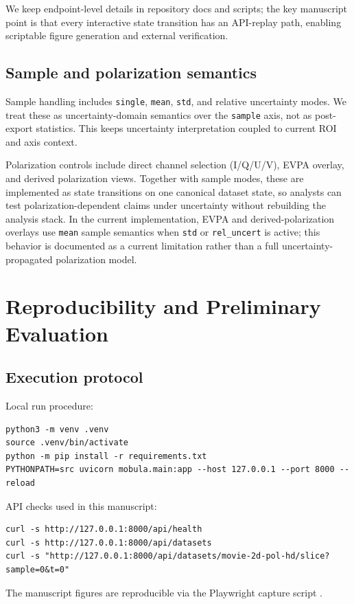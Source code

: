 \documentclass[11pt]{article}
\begin{document}
We keep endpoint-level details in repository docs and scripts; the key manuscript point is that every interactive state transition has an API-replay path, enabling scriptable figure generation and external verification.

\subsection{Sample and polarization semantics}
Sample handling includes \texttt{single}, \texttt{mean}, \texttt{std}, and relative uncertainty modes. We treat these as uncertainty-domain semantics over the \texttt{sample} axis, not as post-export statistics. This keeps uncertainty interpretation coupled to current ROI and axis context.

Polarization controls include direct channel selection (I/Q/U/V), EVPA overlay, and derived polarization views. Together with sample modes, these are implemented as state transitions on one canonical dataset state, so analysts can test polarization-dependent claims under uncertainty without rebuilding the analysis stack. In the current implementation, EVPA and derived-polarization overlays use \texttt{mean} sample semantics when \texttt{std} or \texttt{rel\_uncert} is active; this behavior is documented as a current limitation rather than a full uncertainty-propagated polarization model.

\section{Reproducibility and Preliminary Evaluation}
\subsection{Execution protocol}
Local run procedure:
\begin{verbatim}
python3 -m venv .venv
source .venv/bin/activate
python -m pip install -r requirements.txt
PYTHONPATH=src uvicorn mobula.main:app --host 127.0.0.1 --port 8000 --reload
\end{verbatim}

API checks used in this manuscript:
\begin{verbatim}
curl -s http://127.0.0.1:8000/api/health
curl -s http://127.0.0.1:8000/api/datasets
curl -s "http://127.0.0.1:8000/api/datasets/movie-2d-pol-hd/slice?sample=0&t=0"
\end{verbatim}

The manuscript figures are reproducible via the Playwright capture script
.
\end{document}
